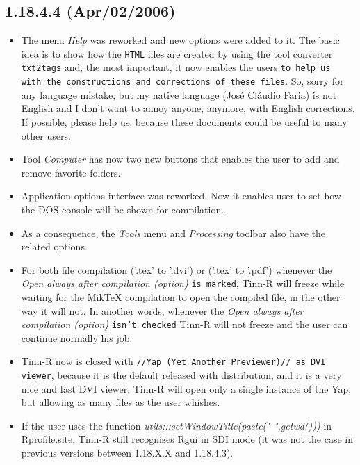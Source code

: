 \subsection*{1.18.4.4 (Apr/02/2006)}
\begin{itemize}
  \item The menu \textit{Help} was reworked and new options were added to it.
    The basic idea is to show how the \texttt{HTML} files are created
    by using the tool converter \texttt{txt2tags} and, the most important,
    it now enables the users \texttt{to help us with the constructions and
      corrections of these files}. So, sorry for any language mistake, but my
    native language (José Cláudio Faria) is not English and I don't want
    to annoy anyone, anymore, with English corrections. If possible,
    please help us, because these documents could be useful to many other users.
  \item Tool \textit{Computer} has now two new buttons that enables the user
    to add and remove favorite folders.
  \item Application options interface was reworked. Now it enables user
    to set how the DOS console will be shown for compilation.
  \item As a consequence, the \textit{Tools} menu and \textit{Processing}
    toolbar also have the related options.
  \item For both file compilation ('.tex' to '.dvi') or ('.tex' to '.pdf')
    whenever the \textit{Open always after compilation (option)} \texttt{is
      marked}, Tinn-R will freeze while waiting for the MikTeX compilation
    to open the compiled file, in the other way it will not. In another
    words, whenever the \textit{Open always after compilation (option)}
    \texttt{isn't checked} Tinn-R will not freeze and the user can continue
    normally his job.
  \item Tinn-R now is closed with \texttt{//Yap (Yet Another Previewer)// as
      DVI viewer}, because it is the default released with
    distribution, and it is a very nice and fast DVI viewer.
    Tinn-R will open only a single instance of the Yap, but allowing as
    many files as the user whishes.
  \item If the user uses the function
    \textit{utils:::setWindowTitle(paste("-",getwd()))} in Rprofile.site,
    Tinn-R still recognizes Rgui in SDI mode (it was not the case in previous
    versions between 1.18.X.X and 1.18.4.3).
\end{itemize}



